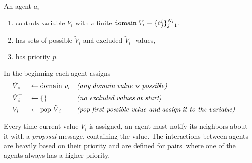 \documentclass[../header]{subfiles}
\begin{document}
\noindent
An agent $a_i$
\begin{enumerate}
  \item controls variable $V_i$ with a finite $\mathrm{domain}~V_i =
        \{{\dot v}^i_j\}_{j=1}^{N_i}$.
  \item has sets of possible ${\tilde V}_i$ and excluded ${\tilde V}_i^-$ values,
  \item has priority $p$.
\end{enumerate}

\noindent
In the beginning each agent assigns
\begin{align*}
  &{\tilde V}_i   &&\leftarrow \mathrm{domain}~v_i       && \textit{(any domain value is possible)} & \\
  &{\tilde V}_i^- &&\leftarrow \{\}              && \textit{(no excluded values at start)}  &\\
  &V_i            &&\leftarrow \mathrm{pop}~{\tilde V}_i && \textit{(pop first possible value and assign it to the variable)} &\\
\end{align*}

Every time current value $V_i$ is assigned, an agent must notify its
neighbors about it with a \emph{proposal} message, containing the value.
The interactions between agents are heavily based on their priority and are
defined for pairs, where one of the agents always has a higher priority.
\end{document}
